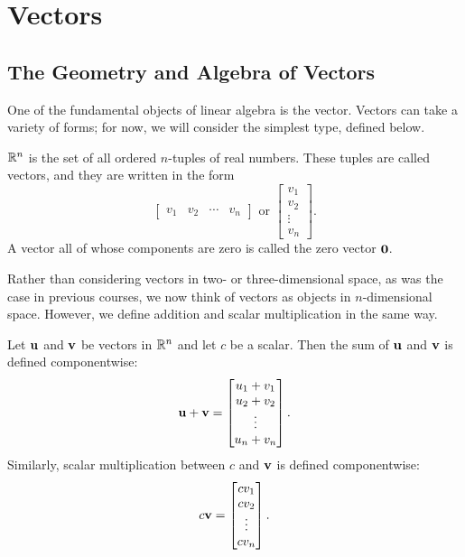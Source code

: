\documentclass[../m073main.tex]{subfiles}
\begin{document}
\chapter{Vectors}
\section{The Geometry and Algebra of Vectors}
One of the fundamental objects of linear algebra is the vector.
Vectors can take a variety of forms; for now, we will consider the simplest type, defined below.

\begin{definition}[Vectors in $\R^n$]
	$\R^n$ is the set of all ordered $n$-tuples of real numbers.
	These tuples are called vectors, and they are written in the form
	\[ \begin{bmatrix} v_1 & v_2 & \cdots & v_n \end{bmatrix} \text{ or } \begin{bmatrix} v_1 \\ v_2 \\ \vdots \\ v_n \end{bmatrix}. \]
	A vector all of whose components are zero is called the zero vector $\mathbf{0}$.
\end{definition}

Rather than considering vectors in two- or three-dimensional space, as was the case in previous courses, we now think of vectors as objects in $n$-dimensional space.
However, we define addition and scalar multiplication in the same way.

\begin{definition}
	Let $\mathbf{u}$ and $\mathbf{v}$ be vectors in $\R^n$ and let $c$ be a scalar.
	Then the sum of $\mathbf{u}$ and $\mathbf{v}$ is defined componentwise:
	\[ \mathbf{u} + \mathbf{v} = \begin{bmatrix} u_1 + v_1 \\ u_2 + v_2 \\ \vdots \\ u_n + v_n \end{bmatrix}. \]
	Similarly, scalar multiplication between $c$ and $\mathbf{v}$ is defined componentwise:
	\[ c \mathbf{v} = \begin{bmatrix} cv_1 \\ cv_2 \\ \vdots \\ cv_n \end{bmatrix}. \]
\end{definition}
\end{document}
